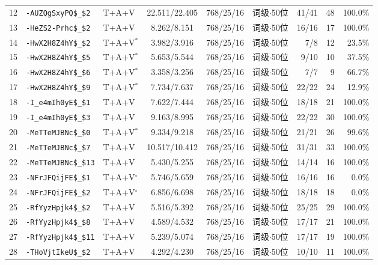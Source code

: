\begin{longtable}{rllcccrrr}
12 & \texttt{-AUZQgSxyPQ\$\_\$2} & T+A+V & 22.511/22.405 & 768/25/16 & 词级$\cdot$50位 & 41/41 & 48 & 100.0\% \\
13 & \texttt{-HeZS2-Prhc\$\_\$2} & T+A+V & 8.262/8.151 & 768/25/16 & 词级$\cdot$50位 & 16/16 & 17 & 100.0\% \\
14 & \texttt{-HwX2H8Z4hY\$\_\$2} & T+A+V$^{*}$ & 3.982/3.916 & 768/25/16 & 词级$\cdot$50位 & 7/8 & 12 & 23.5\% \\
15 & \texttt{-HwX2H8Z4hY\$\_\$5} & T+A+V$^{*}$ & 5.653/5.544 & 768/25/16 & 词级$\cdot$50位 & 9/10 & 10 & 37.5\% \\
16 & \texttt{-HwX2H8Z4hY\$\_\$6} & T+A+V$^{*}$ & 3.358/3.256 & 768/25/16 & 词级$\cdot$50位 & 7/7 & 9 & 66.7\% \\
17 & \texttt{-HwX2H8Z4hY\$\_\$9} & T+A+V$^{*}$ & 7.734/7.637 & 768/25/16 & 词级$\cdot$50位 & 22/22 & 24 & 12.9\% \\
18 & \texttt{-I\_e4mIh0yE\$\_\$1} & T+A+V & 7.622/7.444 & 768/25/16 & 词级$\cdot$50位 & 18/18 & 21 & 100.0\% \\
19 & \texttt{-I\_e4mIh0yE\$\_\$3} & T+A+V & 9.163/8.995 & 768/25/16 & 词级$\cdot$50位 & 22/22 & 30 & 100.0\% \\
20 & \texttt{-MeTTeMJBNc\$\_\$0} & T+A+V$^{*}$ & 9.334/9.218 & 768/25/16 & 词级$\cdot$50位 & 21/21 & 26 & 99.6\% \\
21 & \texttt{-MeTTeMJBNc\$\_\$7} & T+A+V & 10.517/10.412 & 768/25/16 & 词级$\cdot$50位 & 31/31 & 33 & 100.0\% \\
22 & \texttt{-MeTTeMJBNc\$\_\$13} & T+A+V & 5.430/5.255 & 768/25/16 & 词级$\cdot$50位 & 14/14 & 16 & 100.0\% \\
23 & \texttt{-NFrJFQijFE\$\_\$1} & T+A+V$^{\circ}$ & 5.746/5.659 & 768/25/16 & 词级$\cdot$50位 & 16/16 & 16 & 0.0\% \\
24 & \texttt{-NFrJFQijFE\$\_\$2} & T+A+V$^{\circ}$ & 6.856/6.698 & 768/25/16 & 词级$\cdot$50位 & 18/18 & 18 & 0.0\% \\
25 & \texttt{-RfYyzHpjk4\$\_\$2} & T+A+V & 5.516/5.392 & 768/25/16 & 词级$\cdot$50位 & 25/25 & 29 & 100.0\% \\
26 & \texttt{-RfYyzHpjk4\$\_\$8} & T+A+V & 4.589/4.532 & 768/25/16 & 词级$\cdot$50位 & 17/17 & 21 & 100.0\% \\
27 & \texttt{-RfYyzHpjk4\$\_\$11} & T+A+V & 5.239/5.074 & 768/25/16 & 词级$\cdot$50位 & 17/17 & 19 & 100.0\% \\
28 & \texttt{-THoVjtIkeU\$\_\$2} & T+A+V & 4.292/4.230 & 768/25/16 & 词级$\cdot$50位 & 10/10 & 11 & 100.0\% \\

\end{longtable}
